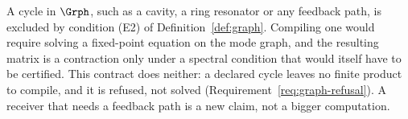 
\begin{remark}\label{rem:noloops}
A cycle in $\Grph$, such as a cavity, a ring resonator or any feedback path,
is excluded by condition (E2) of Definition~\ref{def:graph}. Compiling one would require solving a fixed-point
equation on the mode graph, and the resulting matrix is a contraction only
under a spectral condition that would itself have to be certified. This
contract does neither: a declared cycle leaves no finite product to compile,
and it is refused, not solved (Requirement~\ref{req:graph-refusal}). A
receiver that needs a feedback path is a new claim, not a bigger computation.
\end{remark}
